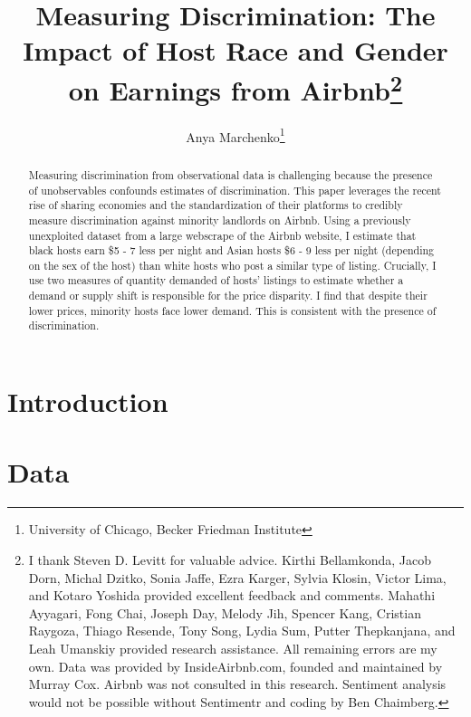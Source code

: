 \documentclass[11pt, oneside]{article}
\begin{document}

\title{Measuring Discrimination: The Impact of Host Race and Gender on Earnings from Airbnb\footnote
	{I thank Steven D. Levitt for valuable advice. Kirthi Bellamkonda, Jacob Dorn, Michal Dzitko, Sonia Jaffe, Ezra Karger, Sylvia Klosin, Victor Lima, and Kotaro Yoshida provided excellent feedback and comments. Mahathi Ayyagari, Fong Chai, Joseph Day, Melody Jih, Spencer Kang, Cristian Raygoza, Thiago Resende, Tony Song, Lydia Sum, Putter Thepkanjana, and Leah Umanskiy provided research assistance. All remaining errors are my own. Data was provided by InsideAirbnb.com, founded and maintained by Murray Cox. Airbnb was not consulted in this research. Sentiment analysis would not be possible without Sentimentr and coding by Ben Chaimberg.}}
\author{Anya Marchenko\footnote{University of Chicago, Becker Friedman Institute}}
\maketitle

\begin{abstract}
Measuring discrimination from observational data is challenging because the presence of unobservables confounds estimates of discrimination. This paper leverages the recent rise of sharing economies and the standardization of their platforms to credibly measure discrimination against minority landlords on Airbnb. Using a previously unexploited dataset from a large webscrape of the Airbnb website, I estimate that black hosts earn \$5 - 7 less per night and Asian hosts \$6 - 9 less per night (depending on the sex of the host) than white hosts who post a similar type of listing. Crucially, I use two measures of quantity demanded of hosts' listings to estimate whether a demand or supply shift is responsible for the price disparity. I find that despite their lower prices, minority hosts face lower demand. This is consistent with the presence of discrimination. 
\end{abstract}

\newpage

\doublespacing
\section{Introduction}


\section{Data}

\end{document}
